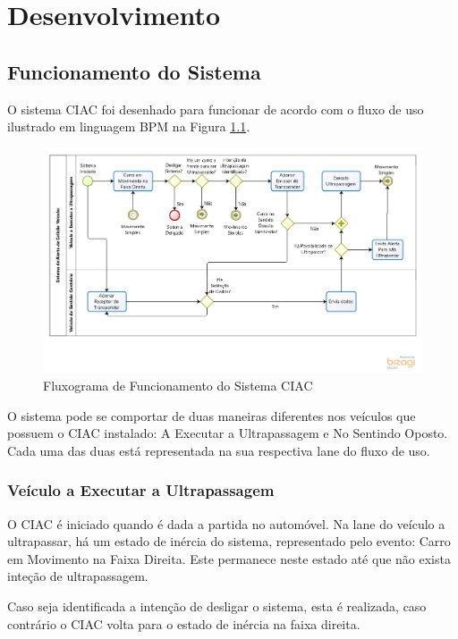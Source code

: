 \chapter[Desenvolvimento]{Desenvolvimento}

\section{Funcionamento do Sistema}

O sistema CIAC foi desenhado para funcionar de acordo com o fluxo de uso ilustrado
em linguagem BPM na Figura \ref{fig:funcionamento_sistema}.

\begin{figure}[h]
  \centering
  \includegraphics[width=470px, scale=1]{figuras/funcionamento_sistema}
  \caption{Fluxograma de Funcionamento do Sistema CIAC}
\label{fig:funcionamento_sistema}
\end{figure}

O sistema pode se comportar de duas maneiras diferentes nos veículos que possuem
o CIAC instalado: A Executar a Ultrapassagem e No Sentindo Oposto. Cada uma das duas
está representada na sua respectiva lane do fluxo de uso.

\subsection{Veículo a Executar a Ultrapassagem}
O CIAC é iniciado quando é dada a partida no automóvel. Na lane do veículo a ultrapassar,
há um estado de inércia do sistema, representado pelo evento: Carro em Movimento
na Faixa Direita. Este permanece neste estado até que não exista inteção de
ultrapassagem.

Caso seja identificada a intenção de desligar o sistema, esta é realizada, caso
contrário o CIAC volta para o estado de inércia na faixa direita.

